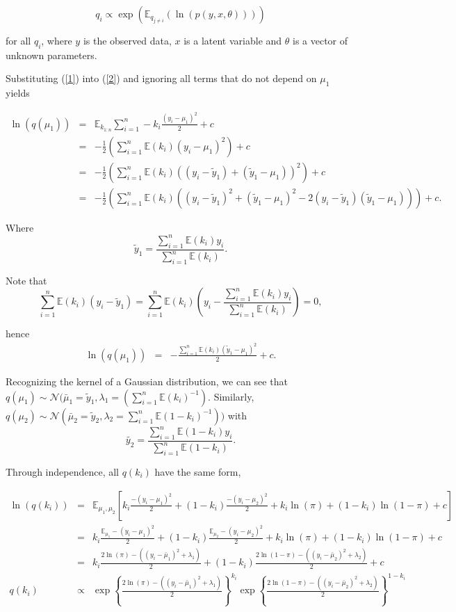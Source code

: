 \documentclass[12pt]{article}\usepackage[]{graphicx}\usepackage[]{color}
\begin{document}
\begin{equation}
\label{2}
q_{i} \propto \exp (\mathbb{E}_{q_{j \neq i}} (\ln(p(y, x, \theta))))
\end{equation}

for all $q_{i}$, where $y$ is the observed data, $x$ is a latent variable and $\theta$ is a vector of unknown parameters.

Substituting (\ref{1}) into (\ref{2}) and ignoring all terms that do not depend on $\mu_1$ yields

\begin{eqnarray*}
\ln(q(\mu_1)) & = & \mathbb{E}_{k_{1:n}} \sum_{i=1}^{n} -k_i \frac{(y_i-\mu_1)^2}{2} + c  \\
& = & -\frac{1}{2} \left(\sum_{i=1}^{n}\mathbb{E}(k_i) (y_i-\mu_{1})^2\right) + c \\ 
& = & -\frac{1}{2}\left(\sum_{i=1}^{n}\mathbb{E}(k_i) ((y_i - \tilde{y}_1) + (\tilde{y}_1 - \mu_1))^2 \right)+ c \\
& = & -\frac{1}{2}\left(\sum_{i=1}^{n}\mathbb{E}(k_i) ((y_i - \tilde{y}_1)^2 + (\tilde{y}_1 - \mu_1)^2 - 2(y_i - \tilde{y}_1)(\tilde{y}_1 - \mu_1))\right) + c.
\end{eqnarray*}

Where
$$\tilde{y}_1 = \frac{\sum_{i=1}^{n} \mathbb{E}(k_i)y_i}{\sum_{i=1}^{n} \mathbb{E}(k_i)}.$$

Note that
$$\sum_{i=1}^{n}\mathbb{E}(k_i)(y_i - \tilde{y}_1) = \sum_{i=1}^{n}\mathbb{E}(k_i)\left(y_i - \frac{\sum_{i=1}^{n} \mathbb{E}(k_i)y_i}{\sum_{i=1}^{n} \mathbb{E}(k_i)}\right) = 0,$$

hence 
\begin{eqnarray*}
\ln(q(\mu_1)) & = & -\frac{\sum_{i=1}^{n}\mathbb{E}(k_i) (\tilde{y}_1-\mu_{1})^2}{2} + c.
\end{eqnarray*}


Recognizing the kernel of a Gaussian distribution, we can see that $q(\mu_1) \sim \mathcal{N} (\bar{\mu}_{1} = \tilde{y}_1, \lambda_{1} = (\sum_{i=1}^{n}\mathbb{E}(k_i)^{-1}).$
Similarly, $q(\mu_2) \sim \mathcal{N} (\bar{\mu}_{2} = \tilde{y}_2, \lambda_{2} = \sum_{i=1}^{n}\mathbb{E}(1-k_i)^{-1}))$ with
$$\tilde{y_2} = \frac{\sum_{i=1}^{n} \mathbb{E}(1-k_i)y_i}{\sum_{i=1}^{n} \mathbb{E}(1-k_i)}.$$

Through independence, all $q(k_i)$ have the same form,

\begin{eqnarray*}
\ln(q(k_i)) & = & \mathbb{E}_{\mu_1, \mu_2} \left[ k_{i} \frac{-(y_i-\mu_1)^2}{2} + (1-k_{i}) \frac{-(y_i-\mu_2)^2}{2} + k_i \ln(\pi) + (1-k_i) \ln(1-\pi) + c \right]\\
& = & k_i\frac{\mathbb{E}_{\mu_1} -(y_i-\mu_1)^2}{2}  + (1-k_i) \frac{\mathbb{E}_{\mu_2} -(y_i-\mu_2)^2}{2}  + k_i \ln(\pi) + (1-k_i) \ln(1-\pi) + c \\
& = & k_i \frac{2\ln(\pi)-((y_i - \bar{\mu}_1)^2 + \lambda_1)}{2} + (1-k_i) \frac{2\ln(1-\pi)-((y_i - \bar{\mu}_2)^2 + \lambda_2)}{2} + c\\
q(k_i) & \propto & \exp \left\{\frac{2\ln(\pi)-((y_i - \bar{\mu}_1)^2 + \lambda_1)}{2} \right\}^{k_i} \exp \left\{\frac{2\ln(1-\pi)-((y_i - \bar{\mu}_2)^2 + \lambda_2)}{2} \right\}^{1-k_i}
\end{eqnarray*}
\end{document}
